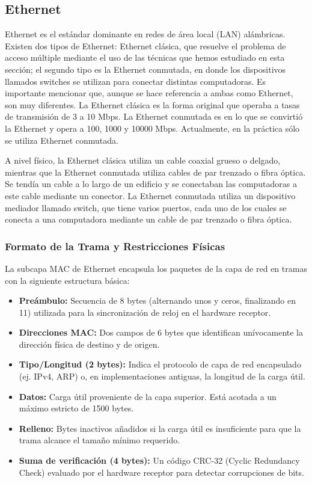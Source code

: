\subsection{Ethernet}

Ethernet es el estándar dominante en redes de área local (LAN) alámbricas. Existen dos tipos de Ethernet: Ethernet clásica, que resuelve el problema de acceso múltiple mediante el uso de las técnicas que hemos estudiado en esta sección; el segundo tipo es la Ethernet conmutada, en donde los dispositivos llamados switches se utilizan para conectar distintas computadoras. Es importante mencionar que, aunque se hace referencia a ambas como Ethernet, son muy diferentes. La Ethernet clásica es la forma original que operaba a tasas de transmisión de 3 a 10 Mbps. La Ethernet conmutada es en lo que se convirtió la Ethernet y opera a 100, 1000 y 10000 Mbps. Actualmente, en la práctica sólo se utiliza Ethernet conmutada.

A nivel físico, la Ethernet clásica utiliza un cable coaxial grueso o delgado, mientras que la Ethernet conmutada utiliza cables de par trenzado o fibra óptica. Se tendía un cable a lo largo de un edificio y se conectaban las computadoras a este cable mediante un conector. La Ethernet conmutada utiliza un dispositivo mediador llamado switch, que tiene varios puertos, cada uno de los cuales se conecta a una computadora mediante un cable de par trenzado o fibra óptica.


\subsubsection{Formato de la Trama y Restricciones Físicas}

La subcapa MAC de Ethernet encapsula los paquetes de la capa de red en tramas con la siguiente estructura básica:

\begin{itemize}
    \item \textbf{Preámbulo:} Secuencia de 8 bytes (alternando unos y ceros, finalizando en 11) utilizada para la sincronización de reloj en el hardware receptor.
    \item \textbf{Direcciones MAC:} Dos campos de 6 bytes que identifican unívocamente la dirección física de destino y de origen.
    \item \textbf{Tipo/Longitud (2 bytes):} Indica el protocolo de capa de red encapsulado (ej. IPv4, ARP) o, en implementaciones antiguas, la longitud de la carga útil.
    \item \textbf{Datos:} Carga útil proveniente de la capa superior. Está acotada a un máximo estricto de 1500 bytes.
    \item \textbf{Relleno:} Bytes inactivos añadidos si la carga útil es insuficiente para que la trama alcance el tamaño mínimo requerido.
    \item \textbf{Suma de verificación (4 bytes):} Un código CRC-32 (Cyclic Redundancy Check) evaluado por el hardware receptor para detectar corrupciones de bits.
\end{itemize}

